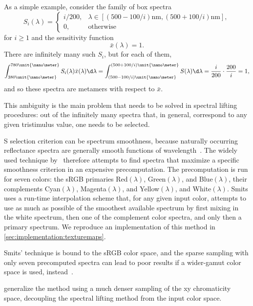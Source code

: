 As a simple example, consider the family of box spectra
\begin{equation*}
    S_i(\lambda) = \begin{cases}
        i / 200, &\lambda \in [ (500-100/i)\unit{\nano\meter}, (500+100/i)\unit{\nano\meter}],\\
        0, &\text{otherwise}
    \end{cases}
\end{equation*}
for $i \geq 1 $ and the sensitivity function
\begin{equation*}
    \bar x(\lambda) = 1.
\end{equation*}
There are infinitely many such $S_i$, but for each of them,
\begin{equation*}
    \int_{380\unit{\nano\meter}}^{780\unit{\nano\meter}} S_i(\lambda) \bar x(\lambda)\d\lambda
    = 
    \int_{(500-100/i)\unit{\nano\meter}}^{(500+100/i)\unit{\nano\meter}} S(\lambda)\d\lambda
    = \frac{i}{200} \cdot \frac{200}{i} = 1,
\end{equation*}
and so these spectra are metamers with respect to $\bar x$.

This ambiguity is the main problem that needs to be solved in spectral
lifting procedures: out of the infinitely many spectra that, in general,
correspond to any given tristimulus value, one needs to be selected.

S selection criterion can be spectrum smoothness, because naturally occurring
reflectance spectra are generally smooth functions of wavelength~\citep{maloney86}. 
The widely
used technique by~\citet{smits99} therefore attempts to find spectra that
maximize a specific smoothness criterion in an expensive precomputation.
The precomputation is run for seven colors: the sRGB primaries 
Red$(\lambda)$, Green$(\lambda)$, and Blue$(\lambda)$, 
their complements
Cyan$(\lambda)$, Magenta$(\lambda)$, and Yellow$(\lambda)$, and White$(\lambda)$. 
Smits uses a run-time interpolation scheme
that, for any given input color, attempts to use as much as possible 
of the smoothest available spectrum by first mixing in the white spectrum, 
then one of the complement color spectra, and only then a primary spectrum.
We reproduce an implementation of this method in \cref{sec:implementation:texturemaps}.

Smits' technique is bound to the sRGB color space, and the sparse sampling with only
seven precomputed spectra can lead to poor results if a wider-gamut color space is
used, instead~\citep{meng2015}.

\citet{meng2015} generalize the method using a much denser sampling of the xy chromaticity
space, decoupling the spectral lifting method from the input color space.

